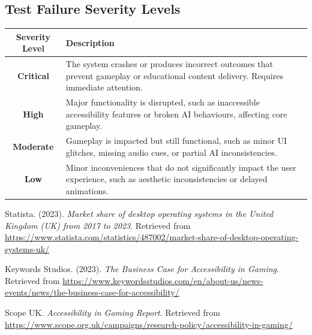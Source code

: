 \documentclass[11pt, a4paper]{article}
\begin{document}
\subsection{Test Failure Severity Levels}

\begin{center}
\begin{tabularx}{\linewidth}{|c|X|}
    \hline
    \textbf{Severity Level} & \textbf{Description} \\
    \hline
    \textbf{Critical} & The system crashes or produces incorrect outcomes that prevent gameplay or educational content delivery. Requires immediate attention. \\
    \hline
    \textbf{High} & Major functionality is disrupted, such as inaccessible accessibility features or broken AI behaviours, affecting core gameplay. \\
    \hline
    \textbf{Moderate} & Gameplay is impacted but still functional, such as minor UI glitches, missing audio cues, or partial AI inconsistencies. \\
    \hline
    \textbf{Low} & Minor inconveniences that do not significantly impact the user experience, such as aesthetic inconsistencies or delayed animations. \\
    \hline
\end{tabularx}
\end{center}



\begin{thebibliography}{}
Statista. (2023). \emph{Market share of desktop operating systems in the United Kingdom (UK) from 2017 to 2023}. Retrieved from \url{https://www.statista.com/statistics/487002/market-share-of-desktop-operating-systems-uk/}

Keywords Studios. (2023). \emph{The Business Case for Accessibility in Gaming}. Retrieved from \url{https://www.keywordsstudios.com/en/about-us/news-events/news/the-business-case-for-accessibility/}

Scope UK. \emph{Accessibility in Gaming Report}. Retrieved from \url{https://www.scope.org.uk/campaigns/research-policy/accessibility-in-gaming/}

\end{thebibliography}
\end{document}
